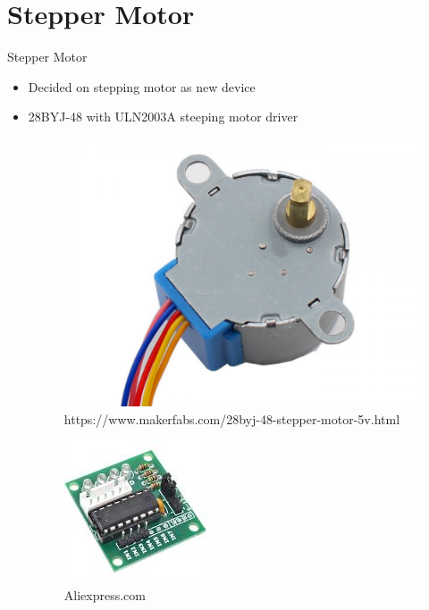 \documentclass{beamer}
\begin{document}
\section{Stepper Motor}
\begin{frame}{Stepper Motor}
\begin{itemize}
\item Decided on stepping motor as new device
\item 28BYJ-48 with ULN2003A steeping motor driver
\begin{figure}
\includegraphics[scale=0.08]{figs/28byj48stepper}
\caption{https://www.makerfabs.com/28byj-48-stepper-motor-5v.html}
\end{figure}

\begin{figure}
\includegraphics[scale=0.4]{figs/uln2003astepper}
\caption{Aliexpress.com}
\end{figure}
\end{itemize}
\end{frame}
\end{document}
